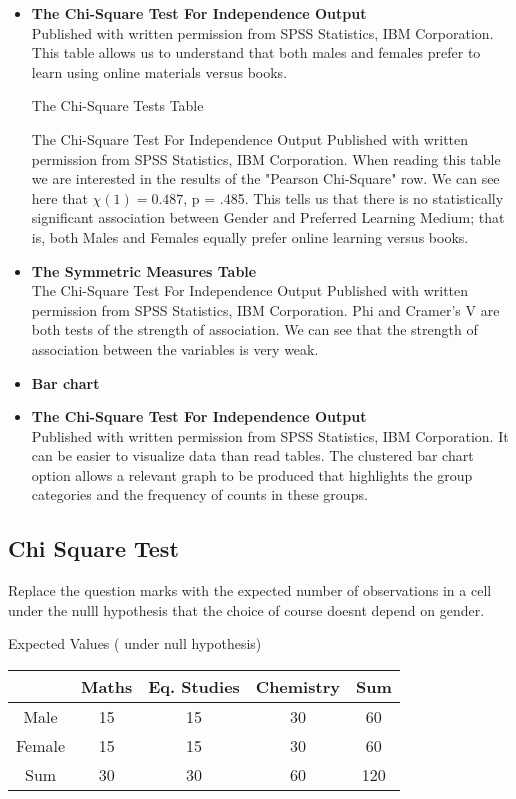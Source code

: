 \documentclass[]{report}
\begin{document}
\begin{itemize}
\item \textbf{The Chi-Square Test For Independence Output}\\
Published with written permission from SPSS Statistics, IBM Corporation.
This table allows us to understand that both males and females prefer to learn using online materials versus books.

The Chi-Square Tests Table

The Chi-Square Test For Independence Output
Published with written permission from SPSS Statistics, IBM Corporation.
When reading this table we are interested in the results of the "Pearson Chi-Square" row. We can see here that $\chi(1) = 0.487$, p = .485. This tells us that there is no statistically significant association between Gender and Preferred Learning Medium; that is, both Males and Females equally prefer online learning versus books.

\item \textbf{The Symmetric Measures Table}\\

The Chi-Square Test For Independence Output
Published with written permission from SPSS Statistics, IBM Corporation.
Phi and Cramer's V are both tests of the strength of association. We can see that the strength of association between the variables is very weak.

\item \textbf{Bar chart}\\

\item \textbf{The Chi-Square Test For Independence Output}\\
Published with written permission from SPSS Statistics, IBM Corporation.
It can be easier to visualize data than read tables. The clustered bar chart option allows a relevant graph to be produced that highlights the group categories and the frequency of counts in these groups.
\end{itemize}
\subsection{Chi Square Test }
Replace the question marks with the expected number of observations
in a cell under the nulll hypothesis that the choice of course doesnt depend on gender.

Expected Values ( under null hypothesis)

\begin{center}
	\begin{tabular}{|c|c|c|c|c|} \hline 
		& Maths & Eq. Studies & Chemistry & Sum \\ \hline
		Male & 15 & 15 & 30& 60 \\ \hline 
		Female & 15 & 15 & 30& 60 \\ \hline
		Sum & 30 & 30 & 60 & 120   \hline
	\end{tabular} 
\end{center}
\end{document}
